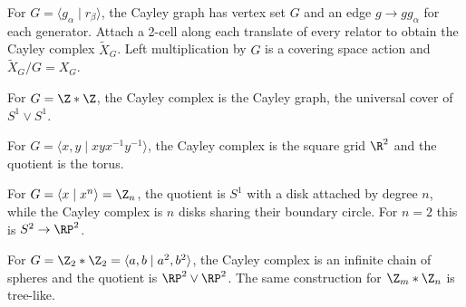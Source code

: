 \begin{definition}
\label{def:cayley-graph-and-complex}


For $G=\langle g_\alpha\mid r_\beta\rangle$, the Cayley graph has vertex set
$G$ and an edge $g\to gg_\alpha$ for each generator. Attach a 2-cell along
each translate of every relator to obtain the Cayley complex $\widetilde X_G$.
Left multiplication by $G$ is a covering space action and
$\widetilde X_G/G=X_G$.
\end{definition}

\begin{example}
\label{ex:cayley-graph-free-group}

For $G=\Z*\Z$, the Cayley complex is the Cayley graph, the universal cover of
$S^1\vee S^1$.
\end{example}

\begin{example}
\label{ex:cayley-complex-torus}

For $G=\langle x,y\mid xyx^{-1}y^{-1}\rangle$, the Cayley complex is the
square grid $\R^2$ and the quotient is the torus.
\end{example}

\begin{example}
\label{ex:cayley-complex-cyclic-group}

For $G=\langle x\mid x^n\rangle=\Z_n$, the quotient is $S^1$ with a disk
attached by degree $n$, while the Cayley complex is $n$ disks sharing their
boundary circle. For $n=2$ this is $S^2\to\RP^2$.
\end{example}

\begin{example}
\label{ex:cayley-complex-infinite-dihedral}

For $G=\Z_2*\Z_2=\langle a,b\mid a^2,b^2\rangle$, the Cayley complex is an
infinite chain of spheres and the quotient is $\RP^2\vee\RP^2$. The same
construction for $\Z_m*\Z_n$ is tree-like.
\end{example}

